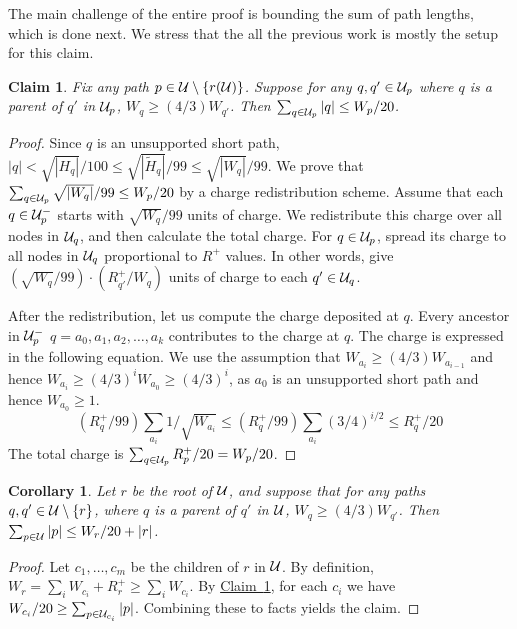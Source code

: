 \documentclass[11pt]{article}
\newtheorem{claim}[theorem]{Claim}
\newtheorem{corollary}[theorem]{Corollary}
\theoremstyle{definition}
\newcommand{\cU}{{\cal U}}
\newcommand{\Clm}[1]{\hyperref[clm:#1]{Claim~\ref*{clm:#1}}} %
\newcommand{\redH}{\widetilde{H}}
\begin{document}
The main challenge of the entire proof is bounding the sum of path lengths, which is done next.
We stress that the all the previous work is mostly the setup for this claim.


\begin{claim} \label{clm:charge} Fix any path $p \in \cU\setminus\{r(\cU)\}$. Suppose for any $q,q' \in \cU_p$
where $q$ is a parent of $q'$ in $\cU_p$, $W_q \geq (4/3)W_{q'}$. Then $\sum_{q \in \cU_p} |q| \leq W_p/20$.
\end{claim}

\begin{proof} Since $q$ is an unsupported short path, $|q| < \sqrt{|H_q|}/100 \leq \sqrt{|\redH_q|}/99 \leq \sqrt{|W_q|}/99$.
We prove that $\sum_{q \in \cU_p} \sqrt{|W_q|}/99 \leq W_p/20$
by a charge redistribution scheme. Assume that each $q \in \cU_p^-$
starts with $\sqrt{W_q}/99$ units of charge. We redistribute this charge over all
nodes in $\cU_q$, and then calculate the total charge. For $q \in \cU_p$, spread
its charge to all nodes in $\cU_q$ proportional to $R^+$ values. In other words,
give $(\sqrt{W_q}/99)\cdot(R^+_{q'}/W_q)$ units of charge to each $q' \in \cU_q$.

After the redistribution, let us compute the charge deposited at $q$. Every ancestor in $\cU_p^-$ 
$q = a_0, a_1, a_2, \ldots, a_k$ contributes to the charge at $q$. The charge is expressed in the following
equation. We use the assumption that $W_{a_i} \geq (4/3) W_{a_{i-1}}$ and hence $W_{a_i} \geq (4/3)^i W_{a_0} \geq (4/3)^i$, 
as $a_0$ is an unsupported short path and hence $W_{a_0}\geq 1$. 
$$ ({R^+_q}/99)\sum_{a_i} 1/\sqrt{W_{a_i}} \leq ({R^+_q}/99)\sum_{a_i} (3/4)^{i/2} \leq R^+_q/20 $$
The total charge is $\sum_{q \in \cU_p} R^+_p/20 = W_p/20$. 
\end{proof}

\begin{corollary} \label{cor:chargeCor}
 Let $r$ be the root of $\cU$, and suppose that for any paths $q,q' \in \cU\setminus \{r\}$, where $q$ is a parent of $q'$ in $\cU$, $W_q \geq (4/3)W_{q'}$.
 Then $\sum_{p \in \cU} |p| \leq W_r/20+|r|$.
\end{corollary}
\begin{proof}
 Let $c_1, \dots, c_m$ be the children of $r$ in $\cU$.  By definition, $W_r = \sum_i W_{c_i}+R^+_r \geq \sum_i W_{c_i}$.
 By \Clm{charge}, for each $c_i$ we have $W_{c_i}/20\geq \sum_{p \in \cU_{c_i}} |p|$.  Combining these to facts yields the claim.
\end{proof}
\end{document}
